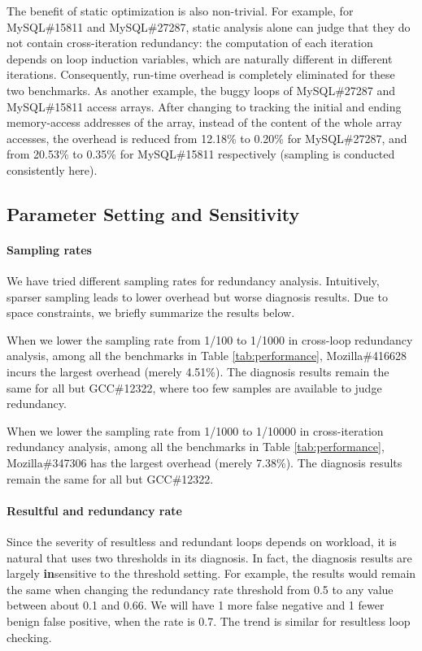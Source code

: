 The benefit of static optimization is also non-trivial. 
For example, for MySQL\#15811 and MySQL\#27287, static analysis alone can
judge that they do not contain cross-iteration redundancy: the computation of 
each iteration depends on loop induction variables, which are naturally different
in different iterations. Consequently, run-time overhead is completely
eliminated for these two benchmarks.
As another example, the buggy loops of MySQL\#27287 and MySQL\#15811 access 
arrays. 
After changing to tracking the initial and ending memory-access addresses
of the array, instead of the content of the whole array accesses,
the overhead is reduced from 12.18\% to 0.20\% for MySQL\#27287, 
and from 20.53\% to 0.35\% for MySQL\#15811 respectively 
(sampling is conducted consistently here). 

\subsection{Parameter Setting and Sensitivity}
\label{sec:sensi}
\paragraph{Sampling rates}
We have tried different sampling rates for redundancy analysis.
Intuitively, sparser sampling leads to lower overhead but worse diagnosis
results. Due to space constraints, we briefly summarize the results below.

When we lower the sampling rate from 1/100 to 1/1000 
in cross-loop redundancy analysis,
among all the benchmarks in Table \ref{tab:performance},
Mozilla\#416628 incurs the largest overhead (merely 4.51\%). 
The diagnosis results remain the same for all but
GCC\#12322, where too few samples are available
to judge redundancy.

When we lower the sampling rate from 1/1000 to 1/10000
in cross-iteration redundancy analysis,
among all the benchmarks in Table \ref{tab:performance},
Mozilla\#347306 has the largest overhead (merely 7.38\%). 
The diagnosis results remain 
the same for all but GCC\#12322.

\paragraph{Resultful and redundancy rate}
Since the severity of resultless and redundant loops depends on
workload, it is natural that \Tool uses two thresholds in its diagnosis.
In fact, the diagnosis results are largely {\bf in}sensitive to the threshold
setting. For example, the results would remain the same when
changing the redundancy rate threshold from 0.5 to any value between about
0.1 and 0.66. We will have 1 more false negative and 1 fewer benign false positive, 
when the rate is 0.7. The trend is similar for resultless
loop checking. 

